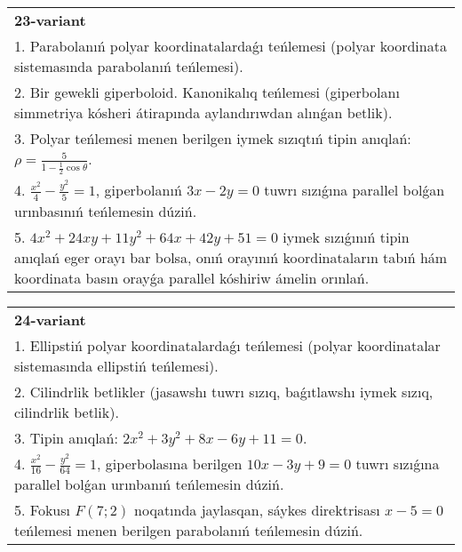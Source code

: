 \documentclass{article}
\begin{document}
\begin{tabular}{m{17cm}}
\textbf{23-variant}\\
1. Parabolanıń polyar koordinatalardaǵı teńlemesi (polyar koordinata sistemasında parabolanıń teńlemesi).\\

2. Bir gewekli giperboloid. Kanonikalıq teńlemesi (giperbolanı simmetriya kósheri átirapında aylandırıwdan alınǵan betlik).\\

3. Polyar teńlemesi menen berilgen iymek sızıqtıń tipin anıqlań: $\rho=\frac{5}{1-\frac{1}{2}\cos\theta}$.\\

4. $\frac{x^{2}}{4} - \frac{y^{2}}{5} = 1$, giperbolanıń $3x - 2y = 0$ tuwrı sızıǵına parallel bolǵan urınbasınıń teńlemesin dúziń.  \\

5. $4x^{2} + 24xy + 11y^{2} + 64x + 42y + 51 = 0$ iymek sızıǵınıń tipin anıqlań eger orayı bar bolsa, onıń orayınıń koordinataların tabıń hám koordinata basın orayǵa parallel kóshiriw ámelin orınlań.  
\end{tabular}
\vspace{1cm}


\begin{tabular}{m{17cm}}
\textbf{24-variant}\\
1. Ellipstiń polyar koordinatalardaǵı teńlemesi (polyar koordinatalar sistemasında ellipstiń teńlemesi).\\

2. Cilindrlik betlikler (jasawshı tuwrı sızıq, baǵıtlawshı iymek sızıq, cilindrlik betlik).\\

3. Tipin anıqlań: $2 x^{2}+3 y^{2}+8 x-6 y+11=0$.\\

4. $\frac{x^{2}}{16} - \frac{y^{2}}{64} = 1$, giperbolasına berilgen $10x - 3y + 9 = 0$ tuwrı sızıǵına parallel bolǵan urınbanıń teńlemesin dúziń.  \\

5. Fokusı $F(7;2)$ noqatında jaylasqan, sáykes direktrisası $x - 5 = 0$ teńlemesi menen berilgen parabolanıń teńlemesin dúziń.  
\end{tabular}
\vspace{1cm}
\end{document}
